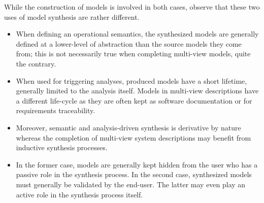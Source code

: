 While the construction of models is involved in both cases, observe that these two uses of model synthesis are rather different.
\begin{itemize}
\item When defining an operational semantics, the synthesized models are generally defined at a lower-level of abstraction than the source models they come from; this is not necessarily true when completing multi-view models, quite the contrary.
\item When used for triggering analyses, produced models have a short lifetime, generally limited to the analysis itself. Models in multi-view descriptions have a different life-cycle as they are often kept as software documentation or for requirements traceability. 
\item Moreover, semantic and analysis-driven synthesis is derivative by nature whereas the completion of multi-view system descriptions may benefit from inductive synthesis processes.
\item In the former case, models are generally kept hidden from the user who has a passive role in the synthesis process. In the second case, synthesized models must generally be validated by the end-user. The latter may even play an active role in the synthesis process itself.
\end{itemize}

